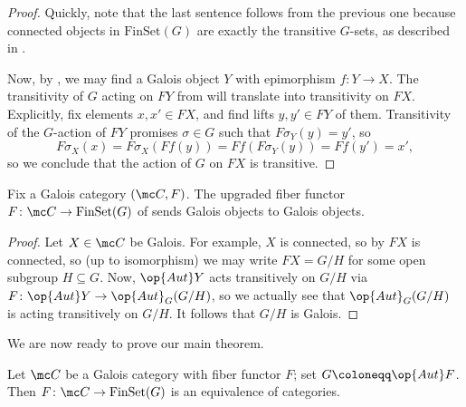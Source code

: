 \documentclass{amsart}
\begin{document}
\begin{proof}
    Quickly, note that the last sentence follows from the previous one because connected objects in $\mathrm{FinSet}(G)$ are exactly the transitive $G$-sets, as described in .
    
    Now, by , we may find a Galois object $Y$ with epimorphism $f\colon Y\to X$. The transitivity of $G$ acting on $FY$ from  will translate into transitivity on $FX$. Explicitly, fix elements $x,x'\in FX$, and find lifts $y,y'\in FY$ of them. Transitivity of the $G$-action of $FY$ promises $\sigma\in G$ such that $F\sigma_Y(y)=y'$, so
    \[F\sigma_X(x)=F\sigma_X(Ff(y))=Ff(F\sigma_Y(y))=Ff(y')=x',\]
    so we conclude that the action of $G$ on $FX$ is transitive.
\end{proof}
\begin{corollary} \label{cor:galois-to-galois}
    Fix a Galois category $(\mc C,F)$. The upgraded fiber functor $F\colon\mc C\to\mathrm{FinSet}(G)$ of  sends Galois objects to Galois objects.
\end{corollary}
\begin{proof}
    Let $X\in\mc C$ be Galois. For example, $X$ is connected, so by  $FX$ is connected, so (up to isomorphism) we may write $FX=G/H$ for some open subgroup $H\subseteq G$. Now, $\op{Aut}Y$ acts transitively on $G/H$ via $F\colon\op{Aut}Y\to\op{Aut}_G(G/H)$, so we actually see that $\op{Aut}_G(G/H)$ is acting transitively on $G/H$. It follows that $G/H$ is Galois.
\end{proof}
We are now ready to prove our main theorem.
\begin{theorem} \label{thm:main-galois-theorem}
    Let $\mc C$ be a Galois category with fiber functor $F$; set $G\coloneqq\op{Aut}F$. Then $F\colon\mc C\to\mathrm{FinSet}(G)$ is an equivalence of categories.
\end{theorem}
\end{document}
